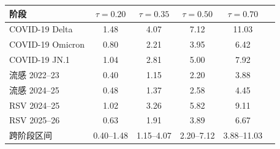 \begin{tabular}{lccccc}
\toprule
阶段 & $\tau=0.20$ & $\tau=0.35$ & $\tau=0.50$ & $\tau=0.70$ \\
\midrule
COVID-19 Delta & 1.48 & 4.07 & 7.12 & 11.03 \\
COVID-19 Omicron & 0.80 & 2.21 & 3.95 & 6.42 \\
COVID-19 JN.1 & 1.04 & 2.81 & 5.00 & 7.92 \\
流感 2022--23 & 0.40 & 1.15 & 2.20 & 3.88 \\
流感 2024--25 & 0.48 & 1.37 & 2.58 & 4.45 \\
RSV 2024--25 & 1.02 & 3.26 & 5.82 & 9.11 \\
RSV 2025--26 & 0.63 & 1.91 & 3.89 & 6.67 \\
\midrule
跨阶段区间 & 0.40--1.48 & 1.15--4.07 & 2.20--7.12 & 3.88--11.03 \\
\bottomrule
\end{tabular}